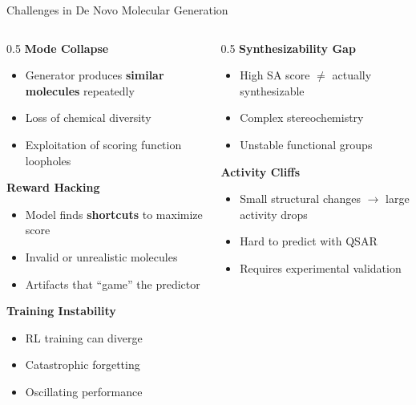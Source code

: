 \documentclass[aspectratio=169,xcolor=table]{beamer}
\begin{document}
\begin{frame}{Challenges in De Novo Molecular Generation}

\begin{columns}
\begin{column}{0.5\textwidth}
\textbf{Mode Collapse}
\begin{itemize}\setlength{\itemsep}{2pt}
    \item Generator produces \textbf{similar molecules} repeatedly
    \item Loss of chemical diversity
    \item Exploitation of scoring function loopholes
\end{itemize}

\vspace{0.3cm}

\textbf{Reward Hacking}
\begin{itemize}\setlength{\itemsep}{2pt}
    \item Model finds \textbf{shortcuts} to maximize score
    \item Invalid or unrealistic molecules
    \item Artifacts that ``game'' the predictor
\end{itemize}

\vspace{0.3cm}

\textbf{Training Instability}
\begin{itemize}\setlength{\itemsep}{0pt}
    \item RL training can diverge
    \item Catastrophic forgetting
    \item Oscillating performance
\end{itemize}
\end{column}

\begin{column}{0.5\textwidth}
\textbf{Synthesizability Gap}
\begin{itemize}\setlength{\itemsep}{2pt}
    \item High SA score $\neq$ actually synthesizable
    \item Complex stereochemistry
    \item Unstable functional groups
\end{itemize}

\vspace{0.3cm}

\textbf{Activity Cliffs}
\begin{itemize}\setlength{\itemsep}{2pt}
    \item Small structural changes $\rightarrow$ large activity drops
    \item Hard to predict with QSAR
    \item Requires experimental validation
\end{itemize}


\end{column}
\end{columns}
\end{frame}
\end{document}
